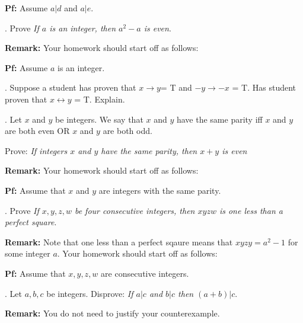\documentclass[12pt]{article}
\begin{document}
\noindent \textbf{Pf:}  Assume $a|d$ and $a |e$.
\vspace{.15in}

.  Prove \textit{ If $a$ is an integer, then $a^{2} - a$ is even}.
\vspace{.05in}

\noindent \textbf{Remark:} Your homework should start off as follows:
\vspace{.05in}

\noindent \textbf{Pf:}  Assume $a$ is an integer.  
\vspace{.15in}


.  Suppose a student has proven that $x \rightarrow y $= T and $-y \rightarrow -x$ = T.  Has student proven that $x \leftrightarrow y$ = T. Explain.  
\vspace{.15in}

.  Let $x$ and $y$ be integers.  We say that $x$ and $y$ have the same parity iff $x$ and $y$ are both even OR $x$ and $y$ are both odd.  
\vspace{.05in}

\noindent Prove: \textit{ If integers $x$ and $y$ have the same parity, then $x + y$ is even}
\vspace{.05in}

\noindent \textbf{Remark:} Your homework should start off as follows:
\vspace{.05in}

\noindent \textbf{Pf:}  Assume that $x$ and $y$ are integers with the same parity.  
\vspace{.15in}


.  Prove \textit{ If $x, y, z, w$ be four consecutive integers, then $xyzw$ is one less than a perfect square}. 
\vspace{.05in}

\noindent \textbf{Remark:} Note that one less than a perfect sqaure means that $xyzy = a^{2} - 1$ for some integer $a$.  Your homework should start off as follows:
\vspace{.05in}

\noindent \textbf{Pf:}  Assume that $x, y, z, w$ are consecutive integers.   
\vspace{.15in}


.  Let $a, b, c$ be integers.  Disprove:  \textit{ If $a | c$ and $b | c$ then $(a + b) | c$}.
\vspace{.05in}

\noindent \textbf{Remark:} You do not need to justify your counterexample. 
\vspace{.15in}
\end{document}
